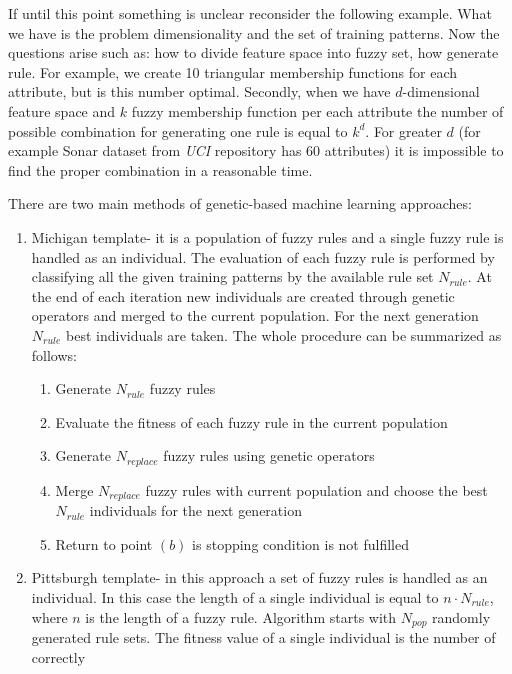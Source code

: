 If until this point something is unclear reconsider the following example. What
we have is the problem dimensionality and the set of training patterns. Now the
questions arise such as: how to divide feature space into fuzzy set, how
generate rule. For example, we create 10 triangular membership functions for each
attribute, but is this number optimal. Secondly, when we have $d$-dimensional
feature space and $k$ fuzzy membership function per each attribute
the number of possible combination for generating one rule is equal to $k^d$.
For greater $d$ (for example Sonar dataset from \textit{UCI} repository has 60
attributes) it is impossible to find the proper combination in a reasonable
time.

There are two main methods of genetic-based machine learning approaches:
\begin{enumerate}
    \item Michigan template- it is a population of fuzzy rules and a single
        fuzzy rule is handled as an individual. The evaluation of each fuzzy
        rule is performed by classifying all the given training patterns by the
        available rule set $N_{rule}$. At the end of each iteration new
        individuals are created through genetic operators and merged to the
        current population. For the next generation $N_{rule}$ best individuals
        are taken. The whole procedure can be summarized as follows:
        \begin{enumerate}
            \item Generate $N_{rule}$ fuzzy rules
            \item Evaluate the fitness of each fuzzy rule in the current
                population
            \item Generate $N_{replace}$ fuzzy rules using genetic operators
            \item Merge $N_{replace}$ fuzzy rules with current population and
                choose the best $N_{rule}$ individuals for the next generation
            \item Return to point $(b)$ is stopping condition is not fulfilled
        \end{enumerate}
    \item Pittsburgh template- in this approach a set of fuzzy rules is handled
        as an individual. In this case the length of a single individual is
        equal to $n\cdot N_{rule}$, where $n$ is the length of a fuzzy rule.
        Algorithm starts with $N_{pop}$ randomly generated rule sets. The
        fitness value of a single individual is the number of correctly

\end{enumerate}
